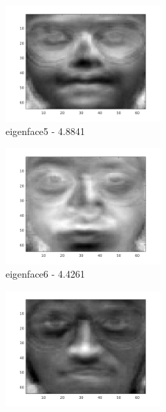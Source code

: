 \documentclass[a4paper]{article}
\begin{document}
\begin{figure}[H]
    \begin{subfigure}[c]{0.24\textwidth}
        \centering
        \includegraphics[width=0.65\textwidth]{images/ex2_x5.png}
        \caption{eigenface5 - 4.8841}
        \label{subfig:ex2_x5}
    \end{subfigure}
    \begin{subfigure}[c]{0.24\textwidth}
        \centering
        \includegraphics[width=0.65\textwidth]{images/ex2_x6.png}
        \caption{eigenface6 - 4.4261}
        \label{subfig:ex2_x6}
    \end{subfigure}
    \begin{subfigure}[c]{0.24\textwidth}
        \centering
        \includegraphics[width=0.65\textwidth]{images/ex2_x7.png}

\end{subfigure}
\end{figure}
\end{document}
